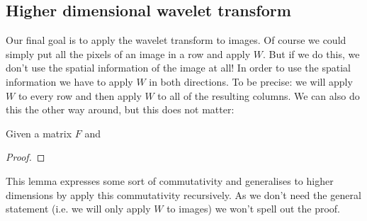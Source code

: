 \subsection{Higher dimensional wavelet transform}
Our final goal is to apply the wavelet transform to images. Of course we could simply put all the pixels of an image in a row and apply $W$. But if we do this, we don't use the spatial information of the image at all! In order to use the spatial information we have to apply $W$ in both directions. To be precise: we will apply $W$ to every row and then apply $W$ to all of the resulting columns. We can also do this the other way around, but this does not matter:

\begin{lemma}
	Given a matrix $F$ and 
\end{lemma}
\begin{proof}
\end{proof}

This lemma expresses some sort of commutativity and generalises to higher dimensions by apply this commutativity recursively. As we don't need the general statement (i.e. we will only apply $W$ to images) we won't spell out the proof.